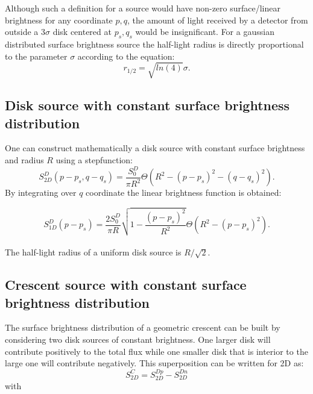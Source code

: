 \documentclass[usenatbib]{mn2e}
\begin{document}
Although such a definition for a source would have non-zero surface/linear brightness for any coordinate $p,q$, the amount of light received by a detector from outside a $3 \sigma$ disk centered at $p_s, q_s$ 
would be insignificant. For a gaussian distributed surface brightness source the half-light radius is directly proportional to the parameter $\sigma$ according to the equation:
\begin{equation}
r_{1/2} = \sqrt{ln(4)} \sigma.
\end{equation}

\subsection{Disk source with constant surface brightness distribution}

One can construct mathematically a disk source with constant surface brightness and radius $R$ using a stepfunction:
\begin{equation}
 S_{2D}^D(p-p_s, q-q_s) = \frac{S_0^D}{\pi R^2} \Theta \left( R^2 - \left( p-p_s \right)^2 - \left( q-q_s \right)^2 \right).
\end{equation}
By integrating over $q$ coordinate the linear brightness function is obtained:


\begin{equation}
 S_{1D}^D(p-p_s) = \frac{2 S_0^D}{\pi R}  \sqrt{1 - \frac{(p-p_s)^2}{R^2} }    \Theta \left( R^2 - \left( p-p_s \right)^2 \right).
\end{equation}
\\
The half-light radius of a uniform disk source is $R/\sqrt{2}$.

\subsection{Crescent source with constant surface brightness distribution}\label{subsec:crescent}

The surface brightness distribution of a geometric crescent can be built 
by considering two disk sources of constant brightness. One larger disk 
will contribute positively to the total flux while one smaller disk 
that is interior to the large one will contribute negatively. This superposition can be written for 2D as:\\

\begin{equation}
 S_{2D}^C =  S_{2D}^{Dp} -  S_{2D}^{Dn}  
 \label{eqn:s2d}
\end{equation}
with\\
\end{document}
